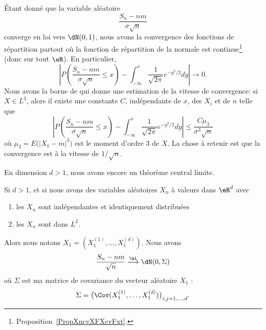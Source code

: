 \begin{remark}
	Étant donné que la variable aléatoire
	\begin{equation}
		\frac{ S_n-nm }{ \sigma\sqrt{n} }
	\end{equation}
	converge en loi vers \( \dN(0,1)\), nous avons la convergence des fonctions de répartition partout où la fonction de répartition de la normale est continue\footnote{Proposition~\ref{PropXncvXFXcvFxt}.} (donc sur tout \( \eR\)). En particulier,
	\begin{equation}
		\left| P\left( \frac{ S_n-nm }{ \sigma\sqrt{n} }\leq x \right)-\int_{-\infty}^x\frac{1}{ \sqrt{2\pi} } e^{-y^2/2}dy \right| \to 0.
	\end{equation}
	Nous avons la borne de  qui donne une estimation de la vitesse de convergence: si \( X\in L^3\), alors  il existe une constante \( C\), indépendante de \( x\), des \( X_i\) et de \( n\) telle que
	\begin{equation}
		\left| P\left( \frac{ S_n-nm }{ \sigma\sqrt{n} }\leq x \right)-\int_{-\infty}^x\frac{1}{ \sqrt{2\pi} } e^{-y^2/2}dy \right| \leq\frac{ C\mu_3 }{ \sigma^3\sqrt{n} }
	\end{equation}
	où \( \mu_3=E\big( | X_1-m |^3 \big)\) est le moment d'ordre \( 3\) de \( X\). La chose à retenir est que la convergence est à la vitesse de \( 1/\sqrt{n}\).
\end{remark}

En dimension \( d>1\), nous avons encore un théorème central limite.
\begin{theorem}		\label{THOooADSIooFrWawC}
	Si \( d>1\), et si nous avons des variables aléatoires \( X_n\) à valeurs dans \( \eR^d\) avec
	\begin{enumerate}
		\item
		      les \( X_n\) sont indépendantes et identiquement distribuées
		\item
		      les \( X_n\) sont dans \( L^2\).
	\end{enumerate}
	Alors nous notons \( X_1=(X_1^{(1)},\ldots,X_1^{(d)})\). Nous avons
	\begin{equation}
		\frac{ S_n-nm }{ \sqrt{n} }\stackrel{\hL}{\longrightarrow}\dN(0,\Sigma)
	\end{equation}
	où \( \Sigma\) est ma matrice de covariance du vecteur aléatoire \( X_1\) :
	\begin{equation}
		\Sigma=\big( \Cov(X_1^{(1)},\ldots,X_1^{(d)}) \big)_{i,j=1,\ldots,d}.
	\end{equation}
\end{theorem}

